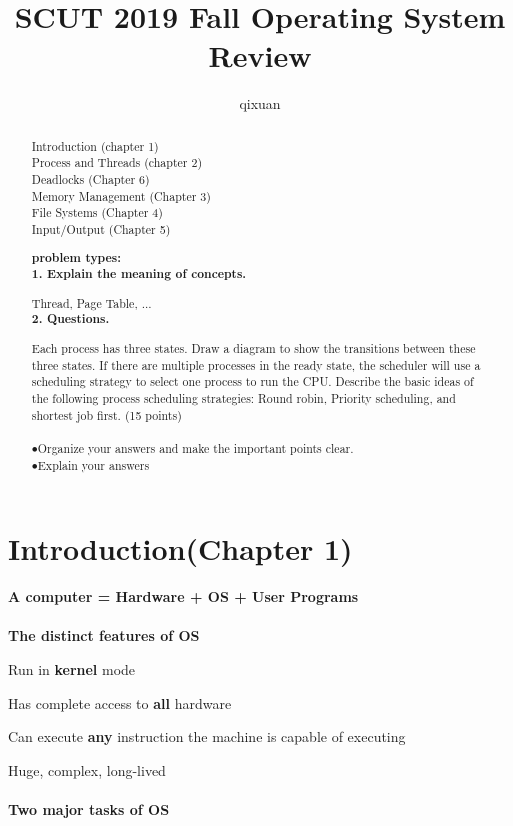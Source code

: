 \documentclass[]{report}
\title{SCUT 2019 Fall Operating System Review}
\author{qixuan}
\begin{document}
\maketitle

\begin{abstract}
	\begin{center}
		Introduction (chapter 1)\\
	Process and Threads (chapter 2)\\
	Deadlocks (Chapter 6)\\
	Memory Management (Chapter 3)\\
	File Systems (Chapter 4)\\
	Input/Output (Chapter 5)
	\end{center}
\textbf{problem types: }\\
\textbf{1. Explain the meaning of concepts.}

Thread, Page Table, ...\\
\textbf{2. Questions.}

Each process has three states. Draw a diagram to
show the transitions between these three states. If there
are multiple processes in the ready state, the scheduler
will use a scheduling strategy to select one process to run
the CPU. Describe the basic ideas of the following process
scheduling strategies: Round robin, Priority scheduling, and
shortest job first. (15 points)\\\\
$\bullet$Organize your answers and make the important points clear.\\
$\bullet$Explain your answers\\
\end{abstract}

\section*{Introduction(Chapter 1)}
\textbf{A computer = Hardware + OS + User Programs}\\\\
\textbf{The distinct features of OS}

Run in \textbf{kernel} mode

Has complete access to \textbf{all} hardware

Can execute \textbf{any} instruction the machine is capable of executing

Huge, complex, long-lived\\\\
\textbf{Two major tasks of OS}
\end{document}
